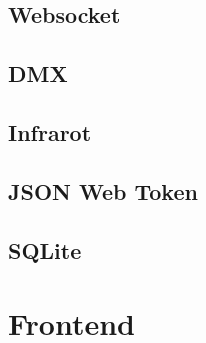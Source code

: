 \documentclass[
    headings=optiontotocandhead,%
    oneside,
    numbers=noenddot,%
    toc=flat, %
    12pt, %
    titlepage, %
    parskip=full, %
    listof=totoc, %
    listof=flat, %
    numbers=noenddot, %
    bibliography=totoc, %
    a4paper,DIV=14,
    BCOR=15mm,
]{scrbook}
\begin{document}
\renewcommand{\kapitelautor}{Autor: Clemens Scharwitzl}



\section{Websocket}\label{Websocket}

\renewcommand{\kapitelautor}{Autor: Clemens Scharwitzl}

    

\section{DMX}\label{DMX}

\renewcommand{\kapitelautor}{Autor: Clemens Scharwitzl}

    

\section{Infrarot}\label{Infrarot}

\renewcommand{\kapitelautor}{Autor: Clemens Scharwitzl}

    

\section{JSON Web Token}\label{JWT}

\renewcommand{\kapitelautor}{Autor: Clemens Scharwitzl}

    

\section{SQLite}\label{SQLite}

\renewcommand{\kapitelautor}{Autor: Clemens Scharwitzl}

    

\chapter{Frontend}\label{Frontend}

\renewcommand{\kapitelautor}{Autor: Dominik Nußbaumer}
\end{document}
